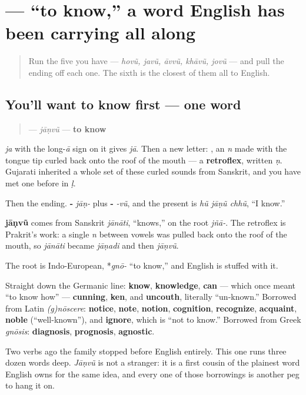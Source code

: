 \section[jāṇvũ]{ — \textquotedblleft{}to know,\textquotedblright{} a word English has been carrying all along}

\label{lesson:GU-C07-jaanvun}



\begin{quote}
Run the five you have — \emph{hovũ, javũ, āvvũ, khāvũ, jovũ} — and pull the ending off each one. The sixth is the closest of them all to English.
\end{quote}

\subsection*{You'll want to know first — one word}
\begin{quote}
\textbf{} — \emph{jāṇvũ} — \textbf{to know}
\end{quote}

\textbf{} \emph{ja} with the long-\emph{ā} sign \textbf{} on it gives \emph{jā}. Then a new letter: \textbf{}, an \emph{n} made with the tongue tip curled back onto the roof of the mouth — a \textbf{retroflex}, written \emph{ṇ}. Gujarati inherited a whole set of these curled sounds from Sanskrit, and you have met one before in \textbf{} \emph{ḷ}.

Then the ending. \textbf{-} \emph{jāṇ-} plus \textbf{-} \emph{-vũ}, and the present is \emph{hũ jāṇũ chhũ}, \textquotedblleft{}I know.\textquotedblright{}

\begin{cousinweb}
\textbf{jāṇvũ} comes from Sanskrit \emph{jānāti}, \textquotedblleft{}knows,\textquotedblright{} on the root \emph{jñā-}. The retroflex is Prakrit's work: a single \emph{n} between vowels was pulled back onto the roof of the mouth, so \emph{jānāti} became \emph{jāṇadi} and then \emph{jāṇvũ}.

The root is Indo-European, *\emph{gnō-} \textquotedblleft{}to know,\textquotedblright{} and English is stuffed with it.

Straight down the Germanic line: \textbf{know}, \textbf{knowledge}, \textbf{can} — which once meant \textquotedblleft{}to know how\textquotedblright{} — \textbf{cunning}, \textbf{ken}, and \textbf{uncouth}, literally \textquotedblleft{}un-known.\textquotedblright{} Borrowed from Latin \emph{(g)nōscere}: \textbf{notice}, \textbf{note}, \textbf{notion}, \textbf{cognition}, \textbf{recognize}, \textbf{acquaint}, \textbf{noble} (\textquotedblleft{}well-known\textquotedblright{}), and \textbf{ignore}, which is \textquotedblleft{}not to know.\textquotedblright{} Borrowed from Greek \emph{gnōsis}: \textbf{diagnosis}, \textbf{prognosis}, \textbf{agnostic}.

Two verbs ago the family stopped before English entirely. This one runs three dozen words deep. \emph{Jāṇvũ} is not a stranger: it is a first cousin of the plainest word English owns for the same idea, and every one of those borrowings is another peg to hang it on.
\end{cousinweb}

